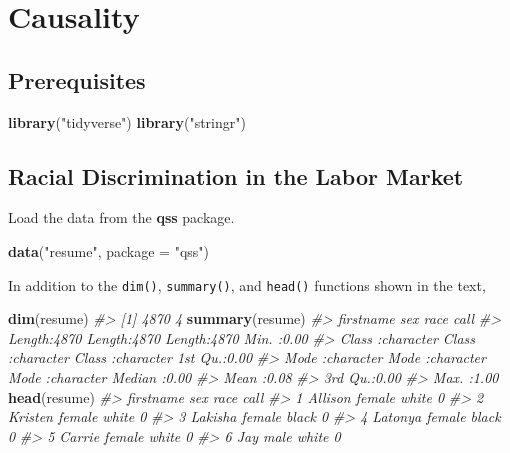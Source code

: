 \documentclass[]{book}
\newenvironment{Shaded}{\begin{snugshade}}{\end{snugshade}}
\newcommand{\KeywordTok}[1]{\textcolor[rgb]{0.13,0.29,0.53}{\textbf{#1}}}
\newcommand{\DataTypeTok}[1]{\textcolor[rgb]{0.13,0.29,0.53}{#1}}
\newcommand{\StringTok}[1]{\textcolor[rgb]{0.31,0.60,0.02}{#1}}
\newcommand{\CommentTok}[1]{\textcolor[rgb]{0.56,0.35,0.01}{\textit{#1}}}
\newcommand{\NormalTok}[1]{#1}
\theoremstyle{definition}
\theoremstyle{definition}
\theoremstyle{definition}
\theoremstyle{remark}
\begin{document}
\chapter{Causality}\label{causality}

\section*{Prerequisites}\label{prerequisites-1}

\begin{Shaded}
\begin{Highlighting}[]
\KeywordTok{library}\NormalTok{(}\StringTok{"tidyverse"}\NormalTok{)}
\KeywordTok{library}\NormalTok{(}\StringTok{"stringr"}\NormalTok{)}
\end{Highlighting}
\end{Shaded}

\section{Racial Discrimination in the Labor
Market}\label{racial-discrimination-in-the-labor-market}

Load the data from the \textbf{qss} package.

\begin{Shaded}
\begin{Highlighting}[]
\KeywordTok{data}\NormalTok{(}\StringTok{"resume"}\NormalTok{, }\DataTypeTok{package =} \StringTok{"qss"}\NormalTok{)}
\end{Highlighting}
\end{Shaded}

In addition to the \texttt{dim()}, \texttt{summary()}, and
\texttt{head()} functions shown in the text,

\begin{Shaded}
\begin{Highlighting}[]
\KeywordTok{dim}\NormalTok{(resume)}
\CommentTok{#> [1] 4870    4}
\KeywordTok{summary}\NormalTok{(resume)}
\CommentTok{#>   firstname             sex                race                call     }
\CommentTok{#>  Length:4870        Length:4870        Length:4870        Min.   :0.00  }
\CommentTok{#>  Class :character   Class :character   Class :character   1st Qu.:0.00  }
\CommentTok{#>  Mode  :character   Mode  :character   Mode  :character   Median :0.00  }
\CommentTok{#>                                                           Mean   :0.08  }
\CommentTok{#>                                                           3rd Qu.:0.00  }
\CommentTok{#>                                                           Max.   :1.00}
\KeywordTok{head}\NormalTok{(resume)}
\CommentTok{#>   firstname    sex  race call}
\CommentTok{#> 1   Allison female white    0}
\CommentTok{#> 2   Kristen female white    0}
\CommentTok{#> 3   Lakisha female black    0}
\CommentTok{#> 4   Latonya female black    0}
\CommentTok{#> 5    Carrie female white    0}
\CommentTok{#> 6       Jay   male white    0}
\end{Highlighting}
\end{Shaded}
\end{document}
